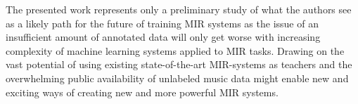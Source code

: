 \documentclass{article}
\begin{document}
The presented work represents only a preliminary study of what the authors see as a likely path for the future of training MIR systems as the issue of an insufficient amount of annotated data will only get worse with increasing complexity of machine learning systems applied to MIR tasks. Drawing on the vast potential of using existing state-of-the-art MIR-systems as teachers and the overwhelming public availability of unlabeled music data might enable new and exciting ways of creating new and more powerful MIR systems. %


\end{document}
